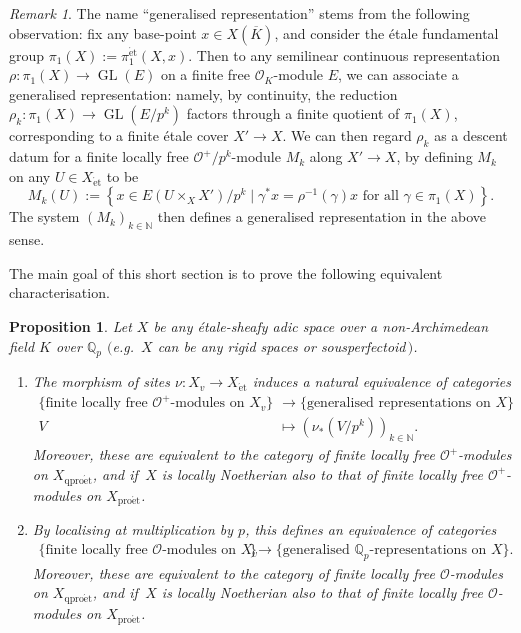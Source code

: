 \documentclass[11pt]{amsart}
\numberwithin{equation}{section}
\newtheorem{Proposition}[thm]{Proposition}
\theoremstyle{definition}
\theoremstyle{remark}
\newtheorem{Remark}[thm]{Remark}
\newcommand{\lra}{\longrightarrow}
\newcommand{\N}{\mathbb{N}}
\renewcommand{\O}{\mathcal{O}}
\newcommand{\Q}{\mathbb{Q}}
\newcommand{\GL}{\operatorname{GL}}
\newcommand{\et}{{\operatorname{\acute{e}t}}}
\newcommand{\proet}{{\operatorname{pro\acute{e}t}}}
\newcommand{\qproet}{{\operatorname{qpro\acute{e}t}}}
\begin{document}
\begin{Remark}
	The name ``generalised representation'' stems from the following observation: fix any base-point $x\in X(\overline{K})$, and consider  the \'etale fundamental group $\pi_1(X):=\pi^{\et}_1(X,x)$. Then to any semilinear continuous representation $\rho\colon \pi_1(X)\to \GL(E)$ on a finite free $\O_{K}$-module $E$, we can associate a generalised representation: namely, by continuity, the reduction $\rho_k\colon \pi_1(X)\to \GL(E/p^k)$ factors through a finite quotient of $\pi_1(X)$, corresponding to a finite \'etale cover $X'\to X$. We can then regard $\rho_k$ as a descent datum for a finite locally free $\O^+/p^k$-module $M_k$ along $X'\to X$, by defining $M_k$ on any $U\in X_{\et}$ to be
	\[ M_k(U):=\left\{x\in E(U\times_XX')/p^k\mid \gamma^\ast x= \rho^{-1}(\gamma)x \text{ for all }\gamma\in \pi_1(X)\right\}.\]
	The system $(M_k)_{k\in \N}$ then defines a generalised representation in the above sense.
\end{Remark}

The main goal of this short section is to prove the following equivalent characterisation.

\begin{Proposition}\label{t:generalised-reps-are-v-bundles}
  Let $X$ be any \'etale-sheafy adic space over a non-Archimedean field $K$ over $\Q_p$  $($e.g.\ $X$ can be any rigid spaces or sousperfectoid\,$)$.
	\begin{enumerate}
		\item\label{t:gravb-1} The morphism of sites $\nu\colon X_{v}\to X_{\et}$ induces a natural equivalence of categories
		\begin{align*}
			\{ \text{finite locally free $\O^+$-modules on $X_{v}$}\}&\lra \{ \text{generalised representations on $X$}\}\\
			V&\longmapsto \left(\nu_{\ast}\left(V/p^k\right)\right)_{k\in\N}.
		\end{align*}
		Moreover, these are equivalent to the category of finite locally free $\O^+$-modules on $X_{\qproet}$, and if\, $X$ is locally Noetherian also to that of finite locally free $\O^+$-modules on $X_{\proet}$.
		\item\label{i:generalised-Qp-reps} By localising at multiplication by $p$, this defines an equivalence of categories
		\begin{align*}
			\{ \text{finite locally free $\O$-modules on $X_{v}$}\}&\lra \{ \text{generalised $\Q_p$-representations on $X$}\}.
		\end{align*} 
		Moreover, these are equivalent to the category of finite locally free $\O$-modules on $X_{\qproet}$, and if\, $X$ is locally Noetherian also to that of finite locally free $\O$-modules on $X_{\proet}$.
	\end{enumerate}
\end{Proposition}
\end{document}
